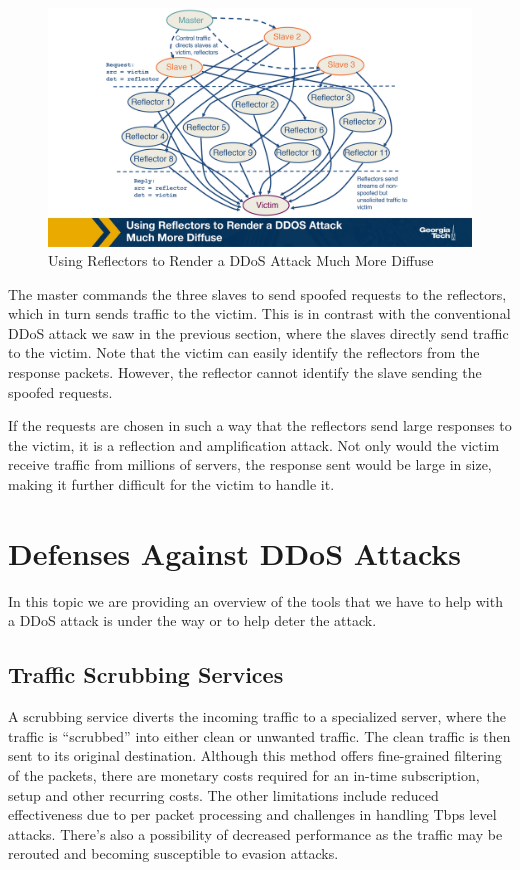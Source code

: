 \documentclass[11pt]{article}
\begin{document}
\begin{figure}[htbp]
\centering
\includegraphics[width=.9\linewidth]{./MD_Figures/9_reflection_amplification_ddos.png}
\caption{\label{fig:orgea55325}Using Reflectors to Render a DDoS Attack Much More Diffuse}
\end{figure}


The master commands the three slaves to send spoofed requests to the reflectors, which in turn sends traffic to the victim. This is in contrast with the conventional DDoS attack we saw in the previous section, where the slaves directly send traffic to the victim. Note that the victim can easily identify the reflectors from the response packets. However, the reflector cannot identify the slave sending the spoofed requests. 

If the requests are chosen in such a way that the reflectors send large responses to the victim, it is a reflection and amplification attack. Not only would the victim receive traffic from millions of servers, the response sent would be large in size, making it further difficult for the victim to handle it.

\section{Defenses Against DDoS Attacks}
\label{sec:org2972f8d}

In this topic we are providing an overview of the tools that we have to help with a DDoS attack is under the way or to help deter the attack.

\subsection{Traffic Scrubbing Services}
\label{sec:orgde1efa5}

A scrubbing service diverts the incoming traffic to a specialized server, where the traffic is “scrubbed” into either clean or unwanted traffic. The clean traffic is then sent to its original destination. Although this method offers fine-grained filtering of the packets, there are monetary costs required for an in-time subscription, setup and other recurring costs. The other limitations include reduced effectiveness due to per packet processing and challenges in handling Tbps level attacks. There’s also a possibility of decreased performance as the traffic may be rerouted and becoming susceptible to evasion attacks.
\end{document}
